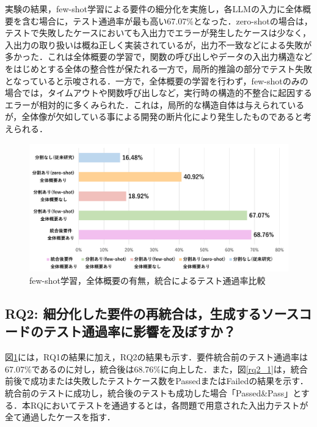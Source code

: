 \documentclass[submit,techrep,noauthor]{ipsj}
\begin{document}
実験の結果，few-shot学習による要件の細分化を実施し，各LLMの入力に全体概要を含む場合に，テスト通過率が最も高い67.07\%となった．zero-shotの場合は，テストで失敗したケースにおいても入出力でエラーが発生したケースは少なく，入出力の取り扱いは概ね正しく実装されているが，出力不一致などによる失敗が多かった．これは全体概要の学習で，関数の呼び出しやデータの入出力構造などをはじめとする全体の整合性が保たれる一方で，局所的推論の部分でテスト失敗となっていると示唆される．一方で，全体概要の学習を行わず，few-shotのみの場合では，タイムアウトや関数呼び出しなど，実行時の構造的不整合に起因するエラーが相対的に多くみられた．これは，局所的な構造自体は与えられているが，全体像が欠如している事による開発の断片化により発生したものであると考えられる．


\begin{figure}[t]
    \centering
    \includegraphics[width=1.0\linewidth]{./Toyoshima_fig/RQ1_and_RQ2.pdf}
    \caption{few-shot学習，全体概要の有無，統合によるテスト通過率比較}
    \label{ses2025}
\end{figure}

\subsection{RQ2: 細分化した要件の再統合は，生成するソースコードのテスト通過率に影響を及ぼすか？}

図\ref{ses2025}には，RQ1の結果に加え，RQ2の結果も示す．要件統合前のテスト通過率は67.07\%であるのに対し，統合後は68.76\%に向上した．また，図\ref{rq2_1}は，統合前後で成功または失敗したテストケース数をPassedまたはFailedの結果を示す．統合前のテストに成功し，統合後のテストも成功した場合「Passed\&Pass」とする．本RQにおいてテストを通過するとは，各問題で用意された入出力テストが全て通過したケースを指す．
\end{document}
